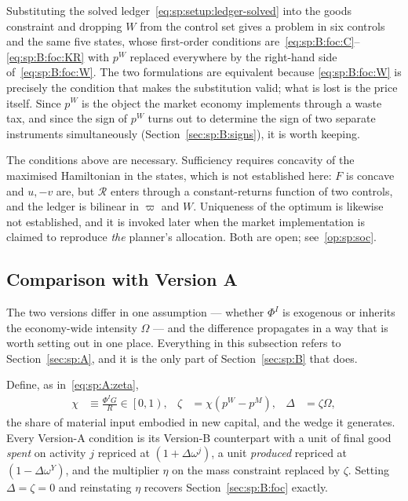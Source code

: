 \begin{remark}\label{rem:sp:B:reduced}
Substituting the solved ledger~\eqref{eq:sp:setup:ledger-solved} into the goods constraint and dropping
$W$ from the control set gives a problem in six controls and the same five states, whose first-order
conditions are~\eqref{eq:sp:B:foc:C}--\eqref{eq:sp:B:foc:KR} with $p^W$ replaced everywhere by the
right-hand side of~\eqref{eq:sp:B:foc:W}. The two formulations are equivalent because
\eqref{eq:sp:B:foc:W} is precisely the condition that makes the substitution valid; what is lost is the
price itself. Since $p^W$ is the object the market economy implements through a waste tax, and since the
sign of $p^W$ turns out to determine the sign of two separate instruments simultaneously
(Section~\ref{sec:sp:B:signs}), it is worth keeping.
\end{remark}

\begin{remark}\label{rem:sp:B:soc}
The conditions above are necessary. Sufficiency requires concavity of the maximised Hamiltonian in the
states, which is not established here: $F$ is concave and $u,-v$ are, but $\mathcal R$ enters through a
constant-returns function of two controls, and the ledger is bilinear in $\varpi$ and $W$. Uniqueness of
the optimum is likewise not established, and it is invoked later when the market implementation is
claimed to reproduce \emph{the} planner's allocation. Both are open; see~\ref{op:sp:soc}.
\end{remark}


\subsection{Comparison with Version A}\label{sec:sp:B:compare}

The two versions differ in one assumption --- whether $\Phi^I$ is exogenous or inherits the economy-wide
intensity $\Omega$ --- and the difference propagates in a way that is worth setting out in one place.
Everything in this subsection refers to Section~\ref{sec:sp:A}, and it is the only part of
Section~\ref{sec:sp:B} that does.

 Define, as in~\eqref{eq:sp:A:zeta},
\begin{align}
\chi &\equiv \frac{\Phi^IG}{R}\in\left[0,1\right),
&
\zeta &= \chi\left(p^W-p^M\right),
&
\Delta &= \zeta\Omega ,
\label{eq:sp:B:compare:Delta}
\end{align}
the share of material input embodied in new capital, and the wedge it generates. Every Version-A
condition is its Version-B counterpart with a unit of final good \emph{spent} on activity $j$ repriced
at $\left(1+\Delta\omega^j\right)$, a unit \emph{produced} repriced at $\left(1-\Delta\omega^Y\right)$,
and the multiplier $\eta$ on the mass constraint replaced by $\zeta$. Setting $\Delta=\zeta=0$ and
reinstating $\eta$ recovers Section~\ref{sec:sp:B:foc} exactly.

